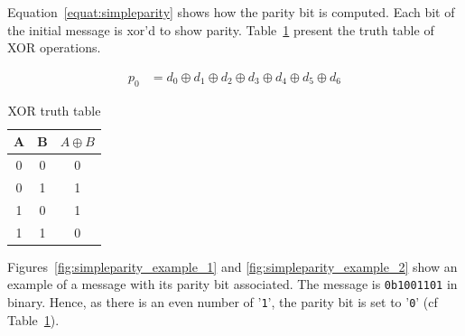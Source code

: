 Equation~\ref{equat:simpleparity} shows how the parity bit is computed. Each bit of the initial message is xor'd to show parity. Table~\ref{tab:xor_truthtable} present the truth table of XOR operations.

\begin{equation} \label{equat:simpleparity}
    \begin{split}
        p_{0} &= d_{0} \oplus d_{1} \oplus d_{2} \oplus d_{3} \oplus d_{4} \oplus d_{5} \oplus d_{6}
    \end{split}
\end{equation}

\begin{table}[t]
    \centering
    \footnotesize
    \caption{XOR truth table}
    \label{tab:xor_truthtable}
    \begin{tabular}{@{}c|c|c@{}}
        \toprule
        A & B & $A \oplus B$ \\\midrule
        0 & 0 & 0            \\
        0 & 1 & 1            \\
        1 & 0 & 1            \\
        1 & 1 & 0            \\
        \bottomrule
    \end{tabular}
\end{table}

Figures~\ref{fig:simpleparity_example_1} and \ref{fig:simpleparity_example_2} show an example of a message with its parity bit associated. The message is \texttt{0b1001101} in binary. Hence, as there is an even number of '\texttt{1}', the parity bit is set to '\texttt{0}' (cf Table~\ref{tab:xor_truthtable}).

